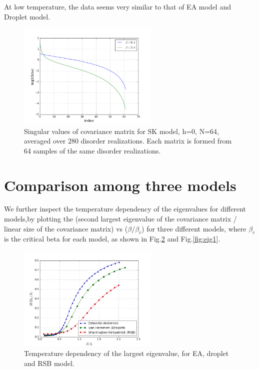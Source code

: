 At low temperature, the data seems very similar to that of EA model and Droplet 
model.


\begin{figure}[ht]
  \centering
  \includegraphics[width=0.6\textwidth]{img/matrix/svdDistRSB.png}
  \caption{Singular values of covariance matrix for SK model, h=0, N=64, 
averaged over 280 disorder realizations. 
Each matrix is formed from 64 samples of the same disorder realizations.}
  \label{fig:eigRSB}
\end{figure}

\section{Comparison among three models}
We further inspect the temperature dependency of the eigenvalues for different
models,by plotting the (second largest eigenvalue of the covariance matrix / linear size 
of the covariance matrix) vs ($\beta/\beta_c$) for three different models, where
$\beta_c$ is the critical beta for each model, as shown in Fig.\ref{fig:eig0} 
and Fig.\ref{fig:eig1}.

\begin{figure}[ht]
  \centering
  \includegraphics[width=0.6\textwidth]{img/matrix/svd0_vs_beta.png}
  \caption{Temperature dependency of the largest eigenvalue, for EA, droplet and RSB model.}
  \label{fig:eig0}
\end{figure}


